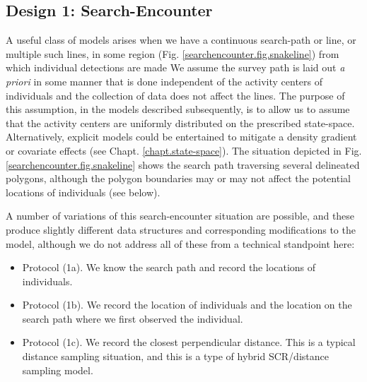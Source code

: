 \subsection{Design 1: Search-Encounter}
\label{searchencounter.sec.fixedpath}

A useful class of models arises when we have a continuous search-path
or line, or multiple such lines, in some region
(Fig. \ref{searchencounter.fig.snakeline}) from which individual
detections are made We assume the survey path is laid out {\it a
  priori} in some manner that is done independent of the activity
centers of individuals and the collection of data does not affect the
lines.  The purpose of this assumption, in the models described
subsequently, is to allow us to assume that the activity centers are
uniformly distributed on the prescribed state-space. Alternatively,
explicit models could be entertained to mitigate a density gradient or
covariate effects (see Chapt. \ref{chapt.state-space}). The situation
depicted in Fig. \ref{searchencounter.fig.snakeline} shows the search
path traversing several delineated polygons, although the polygon
boundaries may or may not affect the potential locations of
individuals (see below).

A number of variations of this search-encounter situation are
possible, and these produce slightly different data structures and
corresponding modifications to the model, although we do not address
all of these from a technical standpoint here:
\begin{itemize}
 \item[] Protocol (1a). We know the search path and record the
   locations of individuals.
 \item[] Protocol (1b). We record the location of individuals and
   the location on the search path where we first observed the individual.
 \item[] Protocol (1c). We record
the closest perpendicular distance. This is a typical
   distance sampling situation, and this is a type of hybrid
   SCR/distance sampling model.
 \end{itemize}

